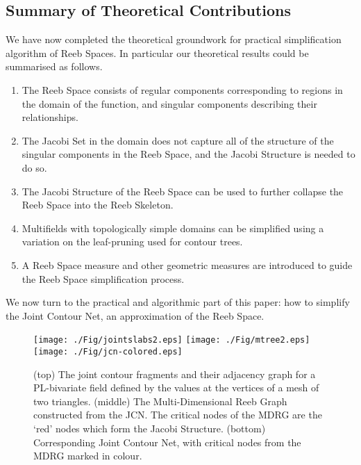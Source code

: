 \documentclass[twocolumn]{article}
\begin{document}
\subsection{Summary of Theoretical Contributions}
\label{sec:mathSummary}

We have now completed the theoretical groundwork for practical
simplification algorithm of Reeb Spaces. In particular our theoretical
results could be summarised as follows.

\begin{enumerate}\itemsep1pt
	\item	The Reeb Space consists of regular components corresponding to regions in the domain
			of the function, and singular components describing their relationships.
	\item	The Jacobi Set in the domain does not capture all of the structure of the singular
			components in the Reeb Space, and the Jacobi Structure is needed to do so.
	\item	The Jacobi Structure of the Reeb Space can be used to
          further collapse the Reeb Space into the Reeb 
			Skeleton.
	\item	Multifields with topologically simple domains can be
          simplified using a variation on the leaf-pruning used for
          contour trees. 
	\item	A Reeb Space measure and other geometric measures are introduced to guide
          the Reeb Space simplification process.
\end{enumerate}

We now turn to the practical and algorithmic part of this paper: how to simplify
the Joint Contour Net, an approximation of the Reeb Space. 

%
 \begin{figure}
\begin{center}
\texttt{[image: ./Fig/jointslabs2.eps]}
\vspace{1cm}
\texttt{[image: ./Fig/mtree2.eps]}
\vspace{1cm}
\texttt{[image: ./Fig/jcn-colored.eps]}
\end{center}
\caption{ (top) The joint contour fragments and their adjacency graph
  for a PL-bivariate field defined by the values  at the vertices of
  a mesh of two triangles. 
(middle) The Multi-Dimensional Reeb Graph constructed from the
  JCN. The critical nodes of the MDRG are the `red' nodes which form the
  Jacobi Structure.  
  (bottom)  Corresponding Joint Contour Net, with
  critical nodes from the MDRG marked in colour.
}
\label{fig:mdrg}
\end{figure} 
\end{document}
